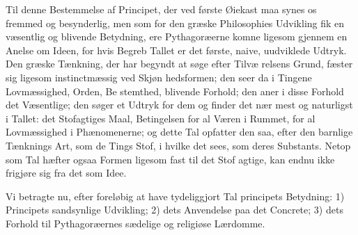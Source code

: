 \documentclass[12pt,a4paper]{book}
\begin{document}
Til denne Bestemmelse af Principet, der ved første Øiekast
maa synes os fremmed og besynderlig, men som for den græske
Philosophies Udvikling fik en væsentlig og blivende Betydning,
\setcounter{footnote}{0}
ere Pythagoræerne komne ligesom gjennem en Anelse om Ideen,
for hvis Begreb Tallet er det første, naive, uudviklede Udtryk.
Den græske Tænkning, der har begyndt at søge efter Tilvæ\-%
relsens Grund, fæster sig ligesom instinctmæssig ved Skjøn\-%
hedsformen; den seer da i Tingene Lovmæssighed, Orden, Be\-%
stemthed, blivende Forhold; den aner i disse Forhold det
Væsentlige; den søger et Udtryk for dem og finder det nær\-%
mest og naturligst i Tallet: det Stofagtiges Maal, Betingelsen
for al Væren i Rummet, for al Lovmæssighed i Phænomenerne;
og dette Tal opfatter den saa, efter den barnlige Tænknings
Art, som de Tings Stof, i hvilke det sees, som deres Substants.
Netop som Tal hæfter ogsaa Formen ligesom fast til det Stof\-%
agtige, kan endnu ikke frigjøre sig fra det som Idee.

Vi betragte nu, efter foreløbig at have tydeliggjort Tal\-%
principets Betydning: 1) Principets sandsynlige Udvikling;
2) dets Anvendelse paa det Concrete; 3) dets Forhold til
Pythagoræernes sædelige og religiøse Lærdomme.
\end{document}
